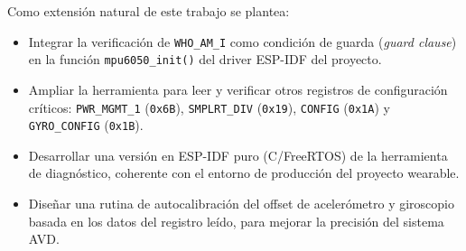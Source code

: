 \documentclass[10pt,twocolumn,a4paper]{article}
\begin{document}
Como extensión natural de este trabajo se plantea:
\begin{itemize}
  \item Integrar la verificación de \texttt{WHO\_AM\_I} como
        condición de guarda (\textit{guard clause}) en la función
        \texttt{mpu6050\_init()} del driver ESP-IDF del proyecto.
  \item Ampliar la herramienta para leer y verificar otros registros
        de configuración críticos: \texttt{PWR\_MGMT\_1} (\texttt{0x6B}),
        \texttt{SMPLRT\_DIV} (\texttt{0x19}), \texttt{CONFIG}
        (\texttt{0x1A}) y \texttt{GYRO\_CONFIG} (\texttt{0x1B}).
  \item Desarrollar una versión en ESP-IDF puro (C/FreeRTOS) de la
        herramienta de diagnóstico, coherente con el entorno de
        producción del proyecto wearable.
  \item Diseñar una rutina de autocalibración del offset de
        acelerómetro y giroscopio basada en los datos del registro
        leído, para mejorar la precisión del sistema AVD.
\end{itemize}
\end{document}
